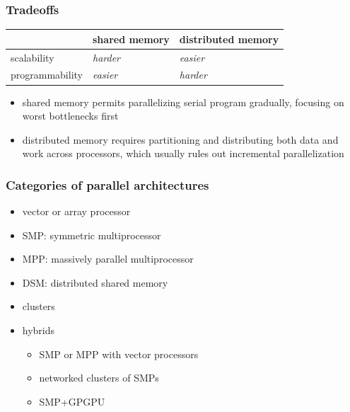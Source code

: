 \begin{frame}[fragile]
%
  \frametitle{Tradeoffs}
%
  \begin{center}
    \begin{minipage}{.75\linewidth}
      \begin{tabular}{l|l|l}
                        & shared memory & distributed memory \\ \hline
        scalability     & {\em harder}  & {\em easier} \\
        programmability & {\em easier}  & {\em harder}
      \end{tabular}
    \end{minipage}
  \end{center}

%
  \begin{itemize}
%
  \item shared memory permits parallelizing serial program gradually, focusing on worst
    bottlenecks first
%
  \item distributed memory requires partitioning and distributing both data and work across
    processors, which usually rules out incremental parallelization
%
  \end{itemize}
%
\end{frame}

\begin{frame}[fragile]
%
  \frametitle{Categories of parallel architectures}
%
  \begin{itemize}
%
  \item vector or array processor
  \item SMP: symmetric multiprocessor
  \item MPP: massively parallel multiprocessor
  \item DSM: distributed shared memory
  \item clusters
  \item hybrids
    \begin{itemize}
      \item SMP or MPP with vector processors
      \item networked clusters of SMPs
      \item SMP+GPGPU 
    \end{itemize}
%
  \end{itemize}
%
\end{frame}

